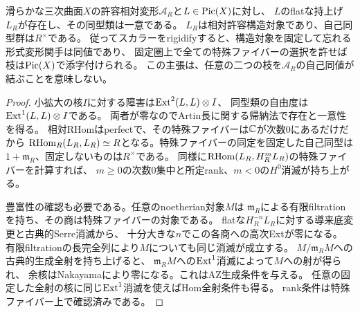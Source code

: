 \begin{theorem}[構造対象の形式的な選択]\label{thm:formal-structure}
滑らかな三次曲面$X$の許容相対変形$\mathcal A_R$と$L\in\operatorname{Pic}(X)$に対し、
$L$のflatな持上げ$L_R$が存在し、その同型類は一意である。
$L_R$は相対許容構造対象であり、自己同型群は$R^\times$である。
従ってスカラーをrigidifyすると、構造対象を固定して忘れる形式変形関手は同値であり、
固定圏上で全ての特殊ファイバーの選択を許せば枝は$\operatorname{Pic}(X)$で添字付けられる。
この主張は、任意の二つの枝を$\mathcal A_R$の自己同値が結ぶことを意味しない。
\end{theorem}
\begin{proof}
小拡大の核$I$に対する障害は$\operatorname{Ext}^2(L,L)\otimes I$、
同型類の自由度は$\operatorname{Ext}^1(L,L)\otimes I$である\cite[Theorem A and flat dual]{Lowen}。
両者が零なのでArtin長に関する帰納法で存在と一意性を得る。
相対RHomはperfectで、その特殊ファイバーは$\mathbb C$が次数0にあるだけだから
$\operatorname{RHom}_R(L_R,L_R)\simeq R$となる。特殊ファイバーの同定を固定した自己同型は
$1+\mathfrak m_R$、固定しないものは$R^\times$である。
同様に$\operatorname{RHom}(L_R,H_R^mL_R)$の特殊ファイバーを計算すれば、
$m\ge0$の次数0集中と所定rank、$m<0$の$H^0$消滅が持ち上がる。

豊富性の確認も必要である。任意のnoetherian対象$M$は
$\mathfrak m_R$による有限filtrationを持ち、その商は特殊ファイバーの対象である。
flatな$H_R^{-n}L_R$に対する導来底変更と古典的Serre消滅から、
十分大きな$n$でこの各商への高次Extが零になる。
有限filtrationの長完全列により$M$についても同じ消滅が成立する。
$M/\mathfrak m_RM$への古典的生成全射を持ち上げると、
$\mathfrak m_RM$への$\operatorname{Ext}^1$消滅によって$M$への射が得られ、
余核はNakayamaにより零になる。これはAZ生成条件を与える。
任意の固定した全射の核に同じ$\operatorname{Ext}^1$消滅を使えばHom全射条件も得る。
rank条件は特殊ファイバー上で確認済みである。
\end{proof}

